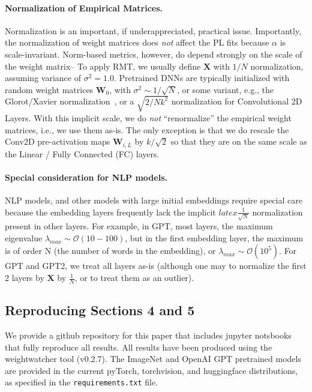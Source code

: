 \paragraph{Normalization of Empirical Matrices.}  
Normalization is an important, if underappreciated, practical issue.
Importantly, the normalization of weight matrices does \emph{not} affect the PL fits because $\alpha$ is scale-invariant.
Norm-based metrics, however, do depend strongly on the scale of the weight matrix--
To apply RMT, we usually define $\mathbf{X}$ with $1/N$ normalization, assuming variance of $\sigma^{2}=1.0$.
Pretrained DNNs are typically initialized with random weight matrices $\mathbf{W}_{0}$, with
 $\sigma^{2}\sim 1/\sqrt{N}$, or some variant, e.g., the Glorot/Xavier normalization~\cite{GloRot}, or a $\sqrt{2/Nk^2}$ normalization for Convolutional 2D Layers. With this implicit scale, 
we do \emph{not} ``renormalize'' the empirical weight matrices, i.e., we use them as-is.
The only exception is that we do rescale the Conv2D pre-activation maps $\mathbf{W}_{i,L}$ 
by $k/\sqrt{2}$ so that they are on the same scale as the Linear / Fully Connected (FC) layers.

\paragraph{Special consideration for NLP models.}
NLP models, and other models with large initial embeddings require special care because the
embedding layers frequently lack the implicit $latex\frac{1}{\sqrt{N}}$ normalization present in other layers.
For example, in GPT, most layers, the maximum eigenvalue $\lambda_{max}\sim\mathcal{O}(10-100)$,
but in the first embedding layer, the maximum is of order N (the number of words in the embedding), or
 $\lambda_{max}\sim\mathcal{O}(10^{5})$.  For GPT and GPT2, we treat all layers as-is (although one may to normalize
the first 2 layers by  $\mathbf{X}$ by $\frac{1}{N}$, or to treat them as an outlier).

\subsection{Reproducing Sections 4 and 5}

We provide a github repository for this paper that includes jupyter notsbooks that fully reproduce all results.
All results have been produced using the weightwatcher tool (v0.2.7).
The ImageNet and OpenAI GPT pretrained models are provided in the current pyTorch, torchvision, and huggingface distributions,
as specified in the \texttt{requirements.txt} file.

